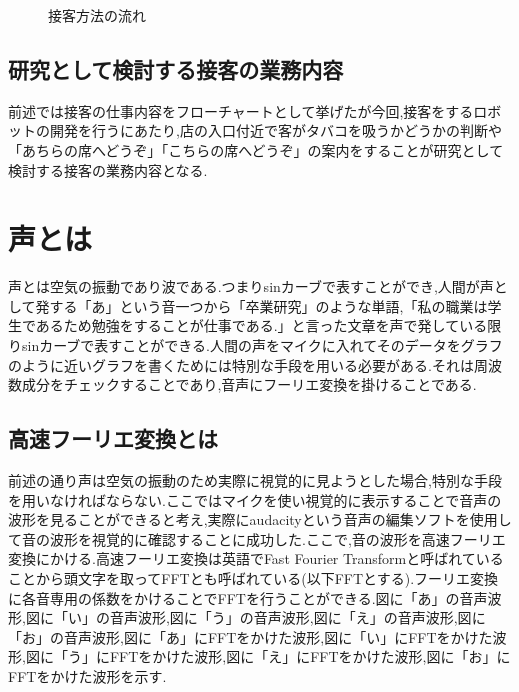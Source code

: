 \documentclass[12pt,oneside]{sotsuken_paper}
\begin{document}
\begin{figure}[htbp]
\scriptsize
{}
%
\caption{接客方法の流れ}
\label{fig:customer-service}%
\normalsize
\end{figure}


\subsection{研究として検討する接客の業務内容}
前述では接客の仕事内容をフローチャートとして挙げたが今回,接客をするロボットの開発を行うにあたり,店の入口付近で客がタバコを吸うかどうかの判断や「あちらの席へどうぞ」「こちらの席へどうぞ」の案内をすることが研究として検討する接客の業務内容となる.


\section{声とは}
声とは空気の振動であり波である.つまりsinカーブで表すことができ,人間が声として発する「あ」という音一つから「卒業研究」のような単語,「私の職業は学生であるため勉強をすることが仕事である.」と言った文章を声で発している限りsinカーブで表すことができる.人間の声をマイクに入れてそのデータをグラフのように近いグラフを書くためには特別な手段を用いる必要がある.それは周波数成分をチェックすることであり,音声にフーリエ変換を掛けることである.


\subsection{高速フーリエ変換とは}
前述の通り声は空気の振動のため実際に視覚的に見ようとした場合,特別な手段を用いなければならない.ここではマイクを使い視覚的に表示することで音声の波形を見ることができると考え,実際にaudacityという音声の編集ソフトを使用して音の波形を視覚的に確認することに成功した.ここで,音の波形を高速フーリエ変換にかける.高速フーリエ変換は英語でFast Fourier Transformと呼ばれていることから頭文字を取ってFFTとも呼ばれている(以下FFTとする).フーリエ変換に各音専用の係数をかけることでFFTを行うことができる.図\label{fig:voice-a}に「あ」の音声波形,図\label{fig:voice-i}に「い」の音声波形,図\label{fig:voice-u}に「う」の音声波形,図\label{fig:voice-e}に「え」の音声波形,図\label{fig:voice-o}に「お」の音声波形,図\label{fig:a_fft}に「あ」にFFTをかけた波形,図\label{fig:i_fft}に「い」にFFTをかけた波形,図\label{fig:u_fft}に「う」にFFTをかけた波形,図\label{fig:e_fft}に「え」にFFTをかけた波形,図\label{fig:o_fft}に「お」にFFTをかけた波形を示す.
\end{document}
